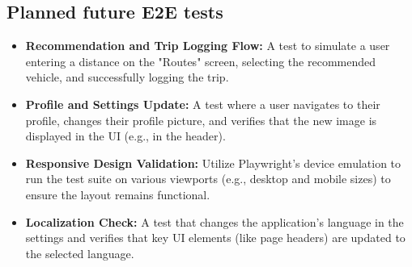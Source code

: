 \subsection{Planned future E2E tests}
\begin{itemize}
    \item \textbf{Recommendation and Trip Logging Flow:} A test to simulate a user entering a distance on the "Routes" screen, selecting the recommended vehicle, and successfully logging the trip.
    \item \textbf{Profile and Settings Update:} A test where a user navigates to their profile, changes their profile picture, and verifies that the new image is displayed in the UI (e.g., in the header).
    \item \textbf{Responsive Design Validation:} Utilize Playwright's device emulation to run the test suite on various viewports (e.g., desktop and mobile sizes) to ensure the layout remains functional.
    \item \textbf{Localization Check:} A test that changes the application's language in the settings and verifies that key UI elements (like page headers) are updated to the selected language.
\end{itemize}
